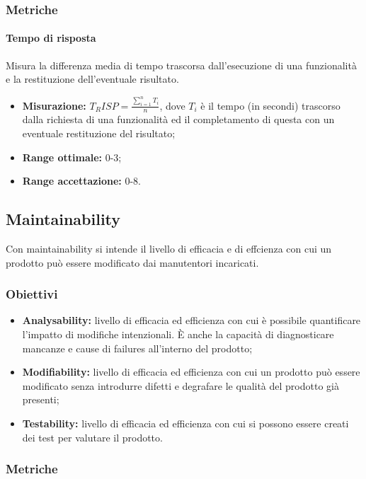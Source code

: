 		\subsubsection{Metriche}
			\paragraph{Tempo di risposta} \Spazio
			Misura la differenza media di tempo trascorsa dall’esecuzione di una funzionalità e la restituzione dell’eventuale risultato.
			\begin{itemize}
				\item {\textbf{Misurazione:} 
				$T_RISP=\frac{\sum\limits_{i=1}^n {T_i }}{n}$, dove $T_i$ è il tempo (in secondi) trascorso dalla richiesta di una funzionalità ed il completamento di questa con un eventuale restituzione del risultato};
				\item {\textbf{Range ottimale:} 0-3;}
				\item {\textbf{Range accettazione:} 0-8.}
			\end{itemize} 
			
	\subsection{Maintainability}
		Con maintainability si intende il livello di efficacia e di effcienza con cui un prodotto può essere modificato dai manutentori incaricati.
		\subsubsection{Obiettivi}
		\begin{itemize}
			\item {\textbf{Analysability:} livello di efficacia ed efficienza con cui è possibile quantificare l'impatto di modifiche intenzionali. È anche la capacità di diagnosticare mancanze e cause di failures all'interno del prodotto; }
			\item{\textbf{Modifiability:} livello di efficacia ed efficienza con cui un prodotto può essere modificato senza introdurre difetti e degrafare le qualità del prodotto già presenti;}
			\item{\textbf{Testability:} livello di efficacia ed efficienza con cui si possono essere creati dei test per valutare il prodotto.}
		\end{itemize}
		\subsubsection{Metriche}
